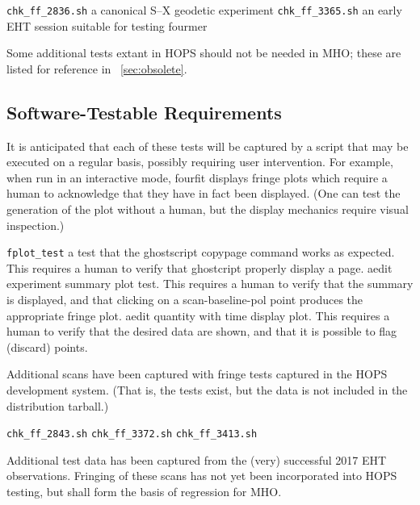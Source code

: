\begin{description}
 \texttt{chk\_ff\_2836.sh} a canonical S--X geodetic experiment
 \texttt{chk\_ff\_3365.sh} an early \ac{EHT} session suitable for
    testing \ac{fourmer}
\end{description}

Some additional tests extant in \ac{HOPS} should not be needed in
\ac{MHO}; these are listed for reference in \App~\ref{sec:obsolete}.

\subsection{Software-Testable Requirements}
\label{sec:regress}

It is anticipated that each of these tests will be captured by a
script that may be executed on a regular basis, possibly requiring
user intervention.  For example, when run in an interactive mode,
\ac{fourfit} displays fringe plots which require a human to acknowledge
that they have in fact been displayed.  (One can test the generation of
the plot without a human, but the display mechanics require visual
inspection.)

\begin{description}
 \texttt{fplot\_test} a test that the \ac{ghostscript} copypage
    command works as expected.  This requires a human to verify that
    \ac{ghostcript} properly display a page.
 \ac{aedit} experiment summary plot test.  This requires a
    human to verify that the summary is displayed, and that clicking
    on a scan-baseline-pol point produces the appropriate fringe plot.
 \ac{aedit} quantity with time display plot.  This requires
    a human to verify that the desired data are shown, and that it
    is possible to flag (discard) points.
 
\end{description}

Additional scans have been captured with fringe tests captured
in the \ac{HOPS} development system.  (That is, the tests exist,
but the data is not included in the distribution tarball.)

\begin{description}
 \texttt{chk\_ff\_2843.sh}
 \texttt{chk\_ff\_3372.sh}
 \texttt{chk\_ff\_3413.sh}
\end{description}

Additional test data has been captured from the (very) successful
2017 \ac{EHT} observations.  Fringing of these scans has not yet
been incorporated into \ac{HOPS} testing, but shall form the basis
of regression for \ac{MHO}.  \FIXME[elaborate]


